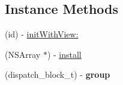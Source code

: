 \subsection*{Instance Methods}
\begin{DoxyCompactItemize}
\item 
(id) -\/ \mbox{\hyperlink{interface_m_a_s_constraint_maker_ad5302364de8afc6fa8467fcebd9a51e2}{init\+With\+View\+:}}
\item 
(N\+S\+Array $\ast$) -\/ \mbox{\hyperlink{interface_m_a_s_constraint_maker_a6863abaf3c1136f48ffcd32315f95479}{install}}
\item 
\mbox{\label{interface_m_a_s_constraint_maker_acbaddaa2ea00c3ca99b9e0c882ab6e2e}} 
(dispatch\+\_\+block\+\_\+t) -\/ {\bfseries group}
\end{DoxyCompactItemize}
